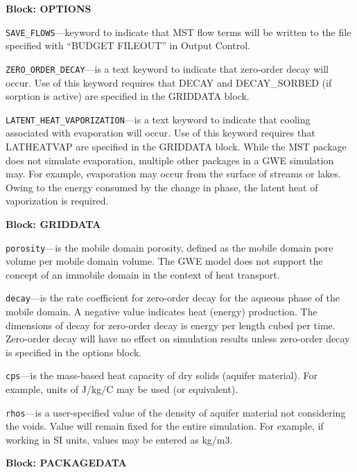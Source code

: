 
\item \textbf{Block: OPTIONS}

\begin{description}
\item \texttt{SAVE\_FLOWS}---keyword to indicate that MST flow terms will be written to the file specified with ``BUDGET FILEOUT'' in Output Control.

\item \texttt{ZERO\_ORDER\_DECAY}---is a text keyword to indicate that zero-order decay will occur.  Use of this keyword requires that DECAY and DECAY\_SORBED (if sorption is active) are specified in the GRIDDATA block.

\item \texttt{LATENT\_HEAT\_VAPORIZATION}---is a text keyword to indicate that cooling associated with evaporation will occur.  Use of this keyword requires that LATHEATVAP are specified in the GRIDDATA block.  While the MST package does not simulate evaporation, multiple other packages in a GWE simulation may.  For example, evaporation may occur from the surface of streams or lakes.  Owing to the energy consumed by the change in phase, the latent heat of vaporization is required.

\end{description}
\item \textbf{Block: GRIDDATA}

\begin{description}
\item \texttt{porosity}---is the mobile domain porosity, defined as the mobile domain pore volume per mobile domain volume.  The GWE model does not support the concept of an immobile domain in the context of heat transport.

\item \texttt{decay}---is the rate coefficient for zero-order decay for the aqueous phase of the mobile domain.  A negative value indicates heat (energy) production.  The dimensions of decay for zero-order decay is energy per length cubed per time.  Zero-order decay will have no effect on simulation results unless zero-order decay is specified in the options block.

\item \texttt{cps}---is the mass-based heat capacity of dry solids (aquifer material). For example, units of J/kg/C may be used (or equivalent).

\item \texttt{rhos}---is a user-specified value of the density of aquifer material not considering the voids. Value will remain fixed for the entire simulation.  For example, if working in SI units, values may be entered as kg/m3.

\end{description}
\item \textbf{Block: PACKAGEDATA}

